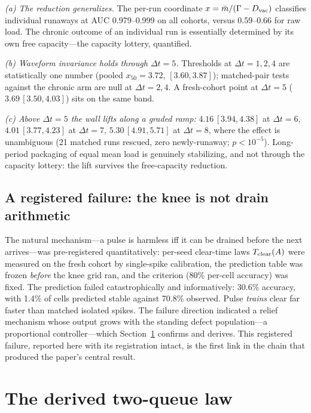\documentclass[11pt]{article}
\newcommand{\dt}{\Delta t}
\begin{document}
\emph{(a) The reduction generalizes.} The per-run coordinate
$x=\bar m/(\Gamma-D_{\rm vac})$ classifies individual runaways at AUC
0.979--0.999 on all cohorts, versus 0.59--0.66 for raw load. The chronic
outcome of an individual run is essentially determined by its own free
capacity---the capacity lottery, quantified.

\emph{(b) Waveform invariance holds through $\dt=5$.} Thresholds at
$\dt=1,2,4$ are statistically one number (pooled $x_{50}=3.72$,
$[3.60,3.87]$); matched-pair tests against the chronic arm are null at
$\dt=2,4$. A fresh-cohort point at $\dt=5$ ($3.69\,[3.50,4.03]$) sits on the
same band.

\emph{(c) Above $\dt=5$ the wall lifts along a graded ramp:} $4.16\,[3.94,4.38]$
at $\dt=6$, $4.01\,[3.77,4.23]$ at $\dt=7$, $5.30\,[4.91,5.71]$ at $\dt=8$,
where the effect is unambiguous (21 matched runs rescued, zero newly-runaway;
$p<10^{-5}$). Long-period packaging of equal mean load is genuinely
stabilizing, and not through the capacity lottery: the lift survives the
free-capacity reduction.

\subsection{A registered failure: the knee is not drain arithmetic}\label{sec:u2}
The natural mechanism---a pulse is harmless iff it can be drained before the
next arrives---was pre-registered quantitatively: per-seed clear-time laws
$T_{\rm clear}(A)$ were measured on the fresh cohort by single-spike
calibration, the prediction table was frozen \emph{before} the knee grid ran,
and the criterion (80\% per-cell accuracy) was fixed. The prediction failed
catastrophically and informatively: 30.6\% accuracy, with 1.4\% of cells
predicted stable against 70.8\% observed. Pulse \emph{trains} clear far
faster than matched isolated spikes. The failure direction indicated a relief
mechanism whose output grows with the standing defect population---a
proportional controller---which Section~\ref{sec:law} confirms and derives.
This registered failure, reported here with its registration intact, is the
first link in the chain that produced the paper's central result.

\section{The derived two-queue law}\label{sec:law}
\end{document}

